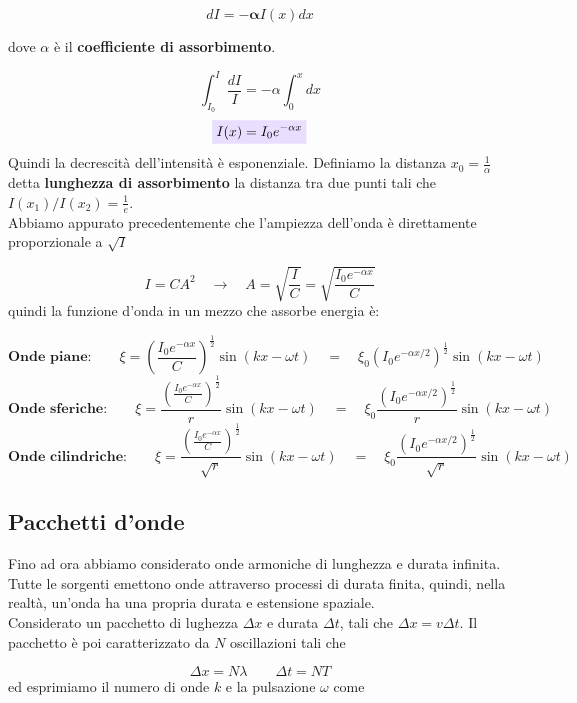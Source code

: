 \documentclass[x11names]{article}
\newcommand{\viola}[1]{\colorbox{yred}{$\displaystyle #1$}}
\begin{document}
	\[ 
 	dI = -\boldsymbol{\alpha} I(x)dx
	\]
	
	dove \(\alpha\) è il \textbf{coefficiente di assorbimento}.
	
	\[ 
	\int_{I_0}^{I} \frac{dI}{I} = -\alpha\int_{0}^{x} dx 
	\]
	\begin{equation}
 		\viola{I(x) = I_0e^{-\alpha x}}
	\end{equation}
	Quindi la decrescità dell'intensità è esponenziale. Definiamo la distanza \(x_0 = \frac{1}{\alpha}\) detta \textbf{lunghezza di assorbimento} la distanza tra due punti tali che \(I(x_1)/I(x_2) = \frac{1}{e}\).\\
	
	\noindent
	Abbiamo appurato precedentemente che l'ampiezza dell'onda è direttamente proporzionale a \(\sqrt{I}\)
	
	\[ 
	I = CA^2 \quad \to \quad A = \sqrt{\frac{I}{C}} = \sqrt{\frac{I_0e^{-\alpha x}}{C}}
	\]
	quindi la funzione d'onda in un mezzo che assorbe energia è:
	
	\[ 
	\textbf{Onde piane:}\qquad \xi = \left(\frac{I_0e^{-\alpha x}}{C}\right)^{\frac{1}{2}} \sin\left(kx-\omega t\right) \quad = \quad \xi_0 \left(I_0e^{-\alpha x/2}\right)^{\frac{1}{2}}\sin\left(kx-\omega t\right)
	\]
	\[ 
	\textbf{Onde sferiche:}\qquad \xi = \frac{\left(\frac{I_0e^{-\alpha x}}{C}\right)^{\frac{1}{2}}}{r} \sin\left(kx-\omega t\right) \quad = \quad \xi_0 \frac{\left(I_0e^{-\alpha x/2}\right)^{\frac{1}{2}}}{r}\sin\left(kx-\omega t\right)
	\]
	\[ 
	\textbf{Onde cilindriche:}\qquad \xi = \frac{\left(\frac{I_0e^{-\alpha x}}{C}\right)^{\frac{1}{2}}}{\sqrt{r}} \sin\left(kx-\omega t\right) \quad = \quad \xi_0 \frac{\left(I_0e^{-\alpha x/2}\right)^{\frac{1}{2}}}{\sqrt{r}}\sin\left(kx-\omega t\right)
	\]
	
	\newpage
	\subsection{Pacchetti d'onde}
	Fino ad ora abbiamo considerato onde armoniche di lunghezza e durata infinita. Tutte le sorgenti emettono onde attraverso processi di durata finita, quindi, nella realtà, un'onda ha una propria durata e estensione spaziale.\\
	
	\noindent
	Considerato un pacchetto di lughezza \(\Delta x\) e durata \(\Delta t\), tali che \(\Delta x = v\Delta t\). Il pacchetto è poi caratterizzato da \(N\) oscillazioni tali che
	
	\[ 
\Delta x  =N \lambda \qquad \Delta t = NT 
	\]
	ed esprimiamo il numero di onde \(k\) e la pulsazione \(\omega\) come
	
\end{document}
